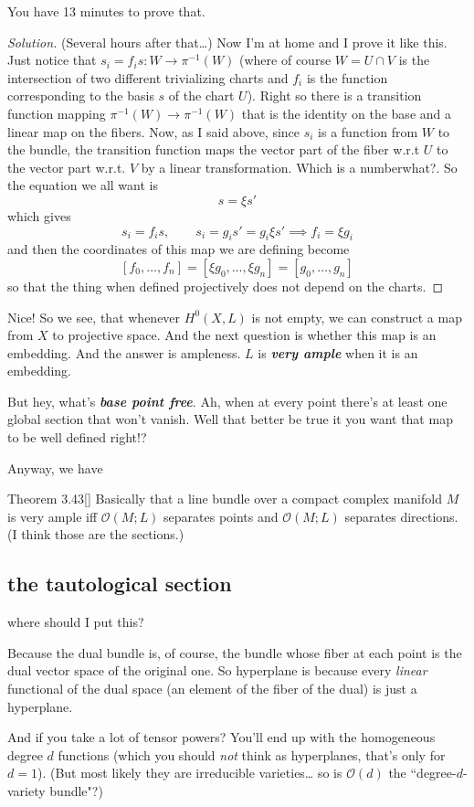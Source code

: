 \begin{exercise}\leavevmode
You have 13 minutes to prove that.
\end{exercise}
\begin{proof}[Solution]\leavevmode
 (Several hours after that…) Now I'm at home and I prove it like this. Just notice that \(s_i=f_is:W \to \pi^{-1}(W)\) (where of course \(W=U \cap V\) is the intersection of two different trivializing charts and \(f_i\) is the function corresponding to the basis \(s\) of the chart \(U\)). Right so there is a transition function mapping \(\pi^{-1}(W) \to \pi^{-1}(W)\) that is the identity on the base and a linear map on the fibers. Now, as I said above, since \(s_i\) is a function from \(W\) to the bundle, the transition function maps the vector part of the fiber w.r.t \(U\) to the vector part w.r.t. \(V\) by a linear transformation. Which is a number{\color{2}what?}. So the equation we all want is
\[s=\xi s'\]
which gives
\[s_i=f_is,\qquad s_i=g_is'=g_i\xi s' \implies f_i=\xi g_i\]
and then the coordinates of this map we are defining become
\[[f_0,\ldots,f_n]=[\xi g_0,\ldots,\xi g_n]=[g_0,\ldots,g_n]\]
so that the thing when defined projectively does not depend on the charts.
\end{proof}

Nice! So we see, that whenever \(H^{0}(X,L)\) is not empty, we can construct a map from \(X\) to projective space. And the next question is whether this map is an embedding. And the answer is ampleness. \(L\) is \textit{\textbf{very  ample}} when it is an embedding.

But hey, what's \textit{\textbf{base point free}}. Ah, when at every point there's at least one global section that won't vanish. Well that better be true it you want that map to be well defined right!?

Anyway, we have
\begin{thing4}{Theorem 3.43}[\cite{lec}]\label{thm:3.43}\leavevmode
Basically that a line bundle over a compact complex manifold \(M\) is very ample iff \(\mathcal{O}(M;L)\) separates points and \(\mathcal{O}(M;L)\) separates directions. (I think those are the sections.)
\end{thing4}

\subsection*{the tautological section}
where should I put this?
\begin{upshot}\leavevmode
Because the dual bundle is, of course, the bundle whose fiber at each point is the dual vector space of the original one. So hyperplane is because every \textit{linear}  functional of the dual space (an element of the fiber of the dual) is just a hyperplane.

And if you take a lot of tensor powers? You'll end up with the homogeneous degree \(d\) functions (which you should \textit{not} think as hyperplanes, that's only for \(d=1\)). (But most likely they are irreducible varieties… so is \(\mathcal{O}(d)\) the ``degree-\(d\)-variety bundle"?)
\end{upshot}


